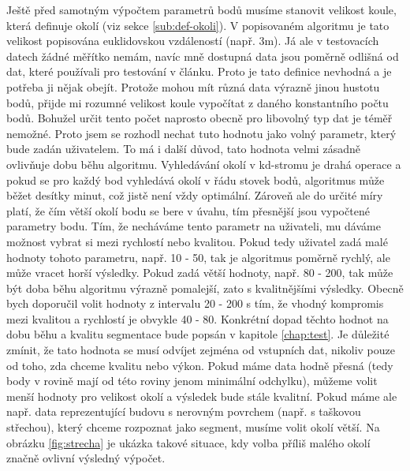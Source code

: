\documentclass[11pt,twoside,a4paper]{book}
\begin{document}
Ještě před samotným výpočtem parametrů bodů musíme stanovit velikost koule, která definuje okolí (viz sekce \ref{sub:def-okoli}). V popisovaném algoritmu je tato velikost popisována euklidovskou vzdáleností (např. 3m). Já ale v testovacích datech žádné měřítko nemám, navíc mně dostupná data jsou poměrně odlišná od dat, které používali pro testování v článku. Proto je tato definice nevhodná a je potřeba ji nějak obejít. Protože mohou mít různá data výrazně jinou hustotu bodů, přijde mi rozumné velikost koule vypočítat z daného konstantního počtu bodů. Bohužel určit tento počet naprosto obecně pro libovolný typ dat je téměř nemožné. Proto jsem se rozhodl nechat tuto hodnotu jako volný parametr, který bude zadán uživatelem. To má i další důvod, tato hodnota velmi zásadně ovlivňuje dobu běhu algoritmu. Vyhledávání okolí v kd-stromu je drahá operace a pokud se pro každý bod vyhledává okolí v řádu stovek bodů, algoritmus může běžet desítky minut, což jistě není vždy optimální. Zároveň ale do určité míry platí, že čím větší okolí bodu se bere v úvahu, tím přesnější jsou vypočtené parametry bodu. Tím, že necháváme tento parametr na uživateli, mu dáváme možnost vybrat si mezi rychlostí nebo kvalitou. Pokud tedy uživatel zadá malé hodnoty tohoto parametru, např. 10 - 50, tak je algoritmus poměrně rychlý, ale může vracet horší výsledky. Pokud zadá větší hodnoty, např. 80 - 200, tak může být doba běhu algoritmu výrazně pomalejší, zato s kvalitnějšími výsledky. Obecně bych doporučil volit hodnoty z intervalu 20 - 200 s tím, že vhodný kompromis mezi kvalitou a rychlostí je obvykle 40 - 80. Konkrétní dopad těchto hodnot na dobu běhu a kvalitu segmentace bude popsán v kapitole \ref{chap:test}. Je důležité zmínit, že tato hodnota se musí odvíjet zejména od vstupních dat, nikoliv pouze od toho, zda chceme kvalitu nebo výkon. Pokud máme data hodně přesná (tedy body v rovině mají od této roviny jenom minimální odchylku), můžeme volit menší hodnoty pro velikost okolí a výsledek bude stále kvalitní. Pokud máme ale např. data reprezentující budovu s nerovným povrchem (např. s taškovou střechou), který chceme rozpoznat jako segment, musíme volit okolí větší. Na obrázku \ref{fig:strecha} je ukázka takové situace, kdy volba příliš malého okolí značně ovlivní výsledný výpočet.
\end{document}
